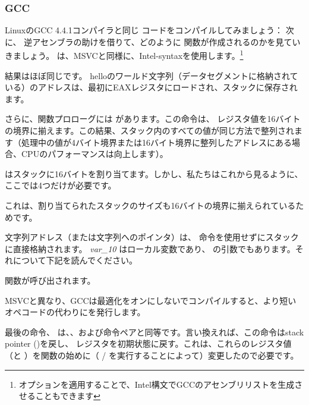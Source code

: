 \subsubsection{GCC}

LinuxのGCC 4.4.1コンパイラと同じ \CCpp コードをコンパイルしてみましょう：
次に、 \IDA 逆アセンブラの助けを借りて、どのように \main 関数が作成されるのかを見ていきましょう。
\IDA は、MSVCと同様に、Intel-syntaxを使用します。\footnote{オプションを適用することで、Intel構文でGCCのアセンブリリストを生成させることもできます}



結果はほぼ同じです。 helloのワールド文字列（データセグメントに格納されている）のアドレスは、最初にEAXレジスタにロードされ、スタックに保存されます。

さらに、関数プロローグには  があります。この命令は、 \ESP レジスタ値を16バイトの境界に揃えます。この結果、スタック内のすべての値が同じ方法で整列されます（処理中の値が4バイト境界または16バイト境界に整列したアドレスにある場合、CPUのパフォーマンスは向上します）。

 はスタックに16バイトを割り当てます。しかし、私たちはこれから見るように、ここでは4つだけが必要です。

これは、割り当てられたスタックのサイズも16バイトの境界に揃えられているためです。

文字列アドレス（または文字列へのポインタ）は、 \PUSH 命令を使用せずにスタックに直接格納されます。 \emph{var\_10} はローカル変数であり、 \printf{} の引数でもあります。それについて下記を読んでください。

\printf 関数が呼び出されます。

MSVCと異なり、GCCは最適化をオンにしないでコンパイルすると、より短いオペコードの代わりにを発行します。

最後の命令、 \LEAVE は、、および命令ペアと同等です。言い換えれば、この命令は\gls{stack pointer} (\ESP)を戻し、 \EBP レジスタを初期状態に戻す。これは、これらのレジスタ値（\ESP と \EBP ）を関数の始めに（ / を実行することによって）変更したので必要です。

